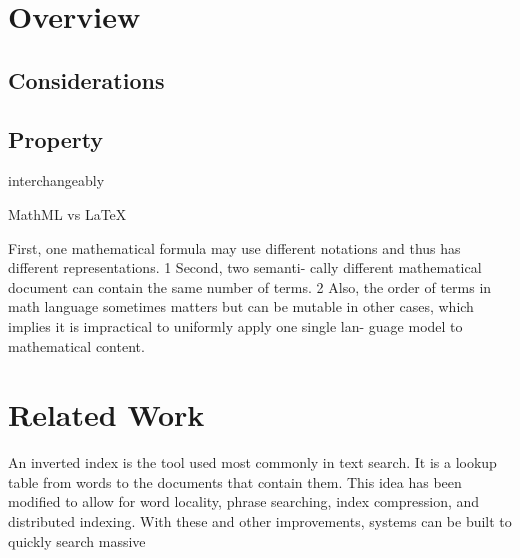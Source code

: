 \section{Overview}
\subsection{Considerations}
\subsection{Property}

interchangeably 

MathML vs LaTeX

First,
one mathematical formula may use different notations and
thus has different representations. 1 Second, two semanti-
cally different mathematical document can contain the same
number of terms. 2 Also, the order of terms in math language
sometimes matters but can be mutable in other cases, which
implies it is impractical to uniformly apply one single lan-
guage model to mathematical content.

\section{Related Work}

An inverted index is the tool used most commonly in text search. It is
a lookup table from words to the documents that contain them. This idea has
been modified to allow for word locality, phrase searching, index compression,
and distributed indexing. With these and other improvements, systems can
be built to quickly search massive
